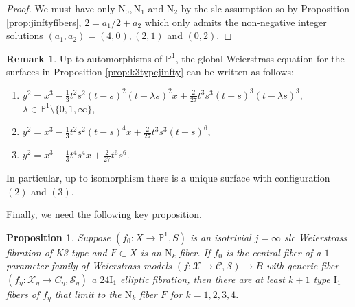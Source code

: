 \documentclass[11pt]{amsart}
\newtheorem{prop}[theorem]{Proposition}
\theoremstyle{definition}
\newtheorem{remark}[theorem]{Remark}
\theoremstyle{remark}
\newcommand{\mb}[1]{\mathbb{#1}}
\begin{document}
	\begin{proof} We must have only $\mathrm{N}_0, \mathrm{N}_1$ and $\mathrm{N}_2$ by the slc assumption so by Proposition \ref{prop:jinftyfibers}, $2 = a_1/2 + a_2$ which only admits the non-negative integer solutions $(a_1,a_2) = (4,0), (2,1)$ and $(0,2)$. \end{proof}
	
	\begin{remark} Up to automorphisms of $\mathbb{P}^1$, the global Weierstrass equation for the surfaces in Proposition \ref{prop:k3typejinfty} can be written as follows: 
		\begin{enumerate}
			\item $y^2 = x^3 - \frac{1}{3}t^2s^2(t-s)^2(t-\lambda s)^2x + \frac{2}{27}t^3s^3(t - s)^3(t- \lambda s)^3$, $\lambda \in \mb{P}^1 \setminus \{0,1,\infty\}$, 
			\item $y^2 = x^3 - \frac{1}{3}t^2s^2(t - s)^4 x + \frac{2}{27}t^3s^3(t- s)^6$, 
			\item $y^2 = x^3 - \frac{1}{3}t^4s^4 x + \frac{2}{27}t^6s^6$. 
		\end{enumerate}
		In particular, up to isomorphism there is a unique surface with configuration $(2)$ and $(3)$. 
	\end{remark}
	
	Finally, we need the following key proposition.
	
	\begin{prop}\label{prop:Nkdiscriminant} Suppose $(f_0 : X \to \mb{P}^1, S)$ is an isotrivial $j = \infty$ slc Weierstrass fibration of K3 type and $F \subset X$ is an $\mathrm{N}_k$ fiber. If $f_0$ is the central fiber of a $1$-parameter family of Weierstrass models $(f : \mathscr{X} \to \mathscr{C}, \mathscr{S}) \to B$ with generic fiber $(f_\eta : \mathscr{X}_\eta \to C_\eta, \mathscr{S}_\eta)$ a $24\mathrm{I}_1$ elliptic fibration, then there are at least $k + 1$ type $\mathrm{I}_1$ fibers of $f_\eta$ that limit to the $\mathrm{N}_k$ fiber $F$ for $k = 1,2,3,4$.
	\end{prop}
	
\end{document}
